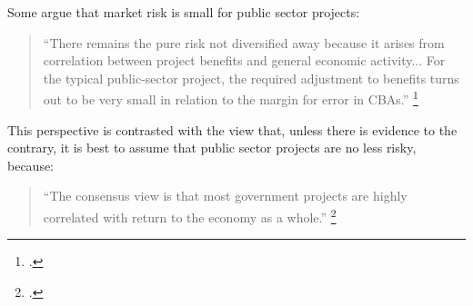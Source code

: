 







Some argue that market risk is small for public sector projects:
\begin{quote}
\textquotedblleft {\small There remains the pure risk not diversified away because it arises from correlation between project benefits and general economic activity... For the typical public-sector project, the required adjustment to benefits turns out to be very small in relation to the margin for error in CBAs.''}%
	\footcite[][v]{BITRE2005RiskinCostBenefitAnalysis}
\end{quote}

This perspective is contrasted with the view that, unless there is evidence to the contrary, it is best to assume that public sector projects are no less risky, because:
\begin{quote}
\textquotedblleft {\small The consensus view is that most government projects are highly correlated with return to the economy as a whole.''}%
	\footcite[][60]{ Harrison-Valuing-the-Future}
\end{quote}


